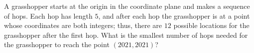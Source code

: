 A grasshopper starts at the origin in the coordinate plane and makes a sequence of hops.
Each hop has length $5$, and after each hop the grasshopper is at a point whose coordinates are both integers; thus, there are $12$ possible locations for the grasshopper after the first hop.
What is the smallest number of hops needed for the grasshopper to reach the point $(2021, 2021)$?
